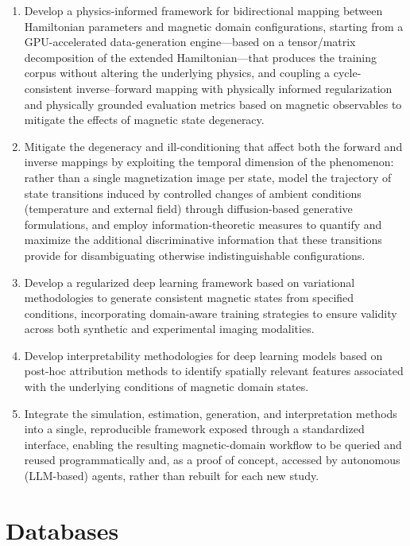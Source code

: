 \documentclass[letterpaper, 12, one column]{article}
\begin{document}
\begin{enumerate}
    \item Develop a physics-informed framework for bidirectional mapping between Hamiltonian parameters and magnetic domain configurations, starting from a GPU-accelerated data-generation engine---based on a tensor/matrix decomposition of the extended Hamiltonian---that produces the training corpus without altering the underlying physics, and coupling a cycle-consistent inverse--forward mapping with physically informed regularization and physically grounded evaluation metrics based on magnetic observables to mitigate the effects of magnetic state degeneracy.

    \item Mitigate the degeneracy and ill-conditioning that affect both the forward and inverse mappings by exploiting the temporal dimension of the phenomenon: rather than a single magnetization image per state, model the trajectory of state transitions induced by controlled changes of ambient conditions (temperature and external field) through diffusion-based generative formulations, and employ information-theoretic measures to quantify and maximize the additional discriminative information that these transitions provide for disambiguating otherwise indistinguishable configurations.

    \item Develop a regularized deep learning framework based on variational methodologies to generate consistent magnetic states from specified conditions, incorporating domain-aware training strategies to ensure validity across both synthetic and experimental imaging modalities.

    \item Develop interpretability methodologies for deep learning models based on post-hoc attribution methods to identify spatially relevant features associated with the underlying conditions of magnetic domain states.

    \item Integrate the simulation, estimation, generation, and interpretation methods into a single, reproducible framework exposed through a standardized interface, enabling the resulting magnetic-domain workflow to be queried and reused programmatically and, as a proof of concept, accessed by autonomous (LLM-based) agents, rather than rebuilt for each new study.
\end{enumerate}

\section{Databases}\label{sec:databases}
\end{document}
